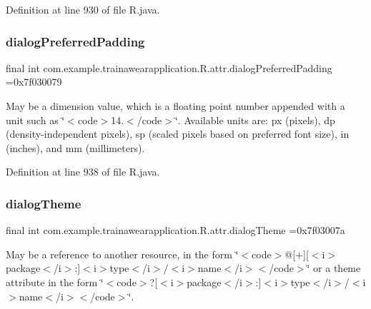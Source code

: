 Definition at line 930 of file R.\+java.

\mbox{\label{classcom_1_1example_1_1trainawearapplication_1_1_r_1_1attr_ac7793c2d1d4485b1f7282ba3b303f7a9}} 
\subsubsection{\texorpdfstring{dialogPreferredPadding}{dialogPreferredPadding}}
{\footnotesize\ttfamily final int com.\+example.\+trainawearapplication.\+R.\+attr.\+dialog\+Preferred\+Padding =0x7f030079\hspace{0.3cm}{\ttfamily [static]}}

May be a dimension value, which is a floating point number appended with a unit such as \char`\"{}$<$code$>$14.\+5sp$<$/code$>$\char`\"{}. Available units are\+: px (pixels), dp (density-\/independent pixels), sp (scaled pixels based on preferred font size), in (inches), and mm (millimeters). 

Definition at line 938 of file R.\+java.

\mbox{\label{classcom_1_1example_1_1trainawearapplication_1_1_r_1_1attr_a18b1c7f501568c43496be3c9557d94d9}} 
\subsubsection{\texorpdfstring{dialogTheme}{dialogTheme}}
{\footnotesize\ttfamily final int com.\+example.\+trainawearapplication.\+R.\+attr.\+dialog\+Theme =0x7f03007a\hspace{0.3cm}{\ttfamily [static]}}

May be a reference to another resource, in the form \char`\"{}$<$code$>$@\mbox{[}+\mbox{]}\mbox{[}$<$i$>$package$<$/i$>$\+:\mbox{]}$<$i$>$type$<$/i$>$/$<$i$>$name$<$/i$>$$<$/code$>$\char`\"{} or a theme attribute in the form \char`\"{}$<$code$>$?\mbox{[}$<$i$>$package$<$/i$>$\+:\mbox{]}$<$i$>$type$<$/i$>$/$<$i$>$name$<$/i$>$$<$/code$>$\char`\"{}. 

